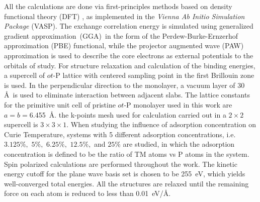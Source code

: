 \documentclass[%
superscriptaddress,
preprint,
showpacs,preprintnumbers,
 amsmath,amssymb,
prb,
]{revtex4-1}
\begin{document}
All the calculations are done via first-principles methods based on
density functional theory (DFT) \cite{hohenberg1964inhomogeneous, kohn1965self}, as implemented in the
\textit{Vienna Ab Initio Simulation Package} {\scriptsize{(VASP)}}\cite{Kresse1996PRB, Kresse1999PRB}. The exchange
correlation energy is simulated using generalized gradient approximation~(GGA)~in the form of the Perdew-Burke-Ernzerhof approximation (PBE) \cite{vasp2} functional, while the projector augmented wave (PAW) \cite{blochl1994projector}
approximation is used to describe the core electrons as external potentials
to the orbitals of study. For structure relaxation and calculation
of the binding energies, a supercell of $ot$-P lattice with centered
sampling point in the first Brillouin zone is used. In the perpendicular
direction to the monolayer, a vacuum layer of 30 \AA~is used to eliminate
interaction between adjacent slabs. The lattice constants for the
primitive unit cell of pristine $ot$-P monolayer used in this work are
$a=b=$6.455~\AA. the k-points mesh used for calculation
carried out in a $2\times2$ supercell is $3\times3\times1$. When
studying the influence of adsorption concentration on Curie Temperature,
systems with 5 different adsorption concentrations, i.e. $3.125\%,$
$5\%,$ $6.25\%,$ $12.5\%,$ and $25\%$ are studied, in which the
adsorption concentration is defined to be the ratio of TM atoms vs
P atoms in the system. Spin polarized calculations are performed throughout
the work. The kinetic energy cutoff for the plane wave basis set is
chosen to be 255~eV, which yields well-converged total energies.
All the structures are relaxed until the remaining force on each atom
is reduced to less than 0.01~eV/\AA.
\end{document}

